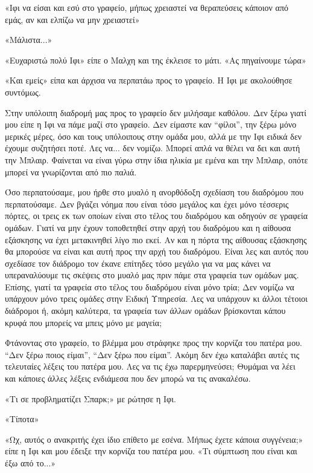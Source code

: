 \documentclass[12pt,twoside, openany]{book}
\begin{document}
«Ιφι να είσαι και εσύ στο γραφείο, μήπως χρειαστεί να θεραπεύσεις κάποιον από εμάς, αν και ελπίζω να μην χρειαστεί»

«Μάλιστα...»

«Ευχαριστώ πολύ Ιφι» είπε ο Μαλχη και της έκλεισε το μάτι. «Ας πηγαίνουμε τώρα»

«Και εμείς» είπα και άρχισα να περπατάω προς το γραφείο. Η Ιφι με ακολούθησε συντόμως.

Στην υπόλοιπη διαδρομή μας προς το γραφείο δεν μιλήσαμε καθόλου. Δεν ξέρω γιατί μου είπε η Ιφι να πάμε μαζί στο γραφείο. Δεν είμαστε καν “φίλοι”, την ξέρω μόνο μερικές μέρες, όσο και τους υπόλοιπους στην ομάδα μου, αλλά με την Ιφι ειδικά δεν έχουμε συζητήσει ποτέ. Λες να... δεν νομίζω. Μπορεί απλά να θέλει να δει και αυτή την Μπλαιρ. Φαίνεται να είναι γύρω στην ίδια ηλικία με εμένα και την Μπλαιρ, οπότε μπορεί να γνωρίζονται από πιο παλιά.

Όσο περπατούσαμε, μου ήρθε στο μυαλό η ανορθόδοξη σχεδίαση του διαδρόμου που περπατούσαμε. Δεν βγάζει νόημα που είναι τόσο μεγάλος και έχει μόνο τέσσερις πόρτες, οι τρεις εκ των οποίων είναι στο τέλος του διαδρόμου και οδηγούν σε γραφεία ομάδων. Γιατί να μην έχουν τοποθετηθεί στην αρχή του διαδρόμου και η αίθουσα εξάσκησης να έχει μετακινηθεί λίγο πιο εκεί. Αν και η πόρτα της αίθουσας εξάσκησης θα μπορούσε να είναι και αυτή προς την αρχή του διαδρόμου. Είναι λες και αυτός που σχεδίασε τον διάδρομο τον έκανε επίτηδες τόσο μεγάλο για να μας κάνει να υπεραναλύουμε τις σκέψεις στο μυαλό μας πριν πάμε στα γραφεία των ομάδων μας. Επίσης, γιατί τα γραφεία στο τέλος του διαδρόμου είναι μόνο τρία; Δεν νομίζω να υπάρχουν μόνο τρεις ομάδες στην Ειδική Υπηρεσία. Λες να υπάρχουν κι άλλοι τέτοιοι διάδρομοι ή, ακόμη καλύτερα, τα γραφεία των άλλων ομάδων βρίσκονται κάπου κρυφά που μπορείς να μπεις μόνο με μαγεία;

Φτάνοντας στο γραφείο, το βλέμμα μου στράφηκε προς την κορνίζα του πατέρα μου. “Δεν ξέρω ποιος είμαι”, “Δεν ξέρω που είμαι”. Ακόμη δεν έχω καταλάβει αυτές τις τελευταίες λέξεις του πατέρα μου. Λες να τις έχω παρερμηνεύσει; Θυμάμαι να λέει και κάποιες άλλες λέξεις ενδιάμεσα που δεν μπορώ να τις ανακαλέσω.

«Τι σε προβληματίζει Σπαρκ;» με ρώτησε η Ιφι.

«Τίποτα»

«Ωχ, αυτός ο ανακριτής έχει ίδιο επίθετο με εσένα. Μήπως έχετε κάποια συγγένεια;» είπε η Ιφι και μου έδειξε την κορνίζα του πατέρα μου. «Τι σύμπτωση που είναι και έξω από το...»
\end{document}
